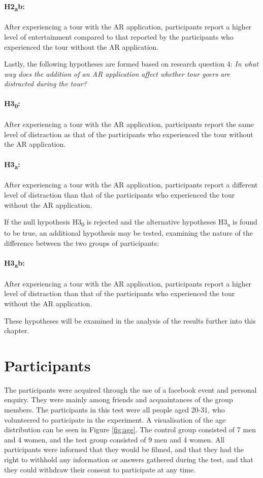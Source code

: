 \paragraph{H2\textsubscript{a}b:} After experiencing a tour with the AR application, participants report a higher level of entertainment compared to that reported by the participants who experienced the tour without the AR application.

Lastly, the following hypotheses are formed based on research question 4: \textit{In what way does the addition of an AR application affect whether tour goers are distracted during the tour?}

\paragraph{H3\textsubscript{0}:} After experiencing a tour with the AR application, participants report the same level of distraction as that of the participants who experienced the tour without the AR application.

\paragraph{H3\textsubscript{a}:}After experiencing a tour with the AR application, participants report a different level of distraction than that of the participants who experienced the tour without the AR application.

If the null hypothesis H3\textsubscript{0} is rejected and the alternative hypotheses H3\textsubscript{a} is found to be true, an additional hypothesis may be tested, examining the nature of the difference between the two groups of participants:

\paragraph{H3\textsubscript{a}b:} After experiencing a tour with the AR application, participants report a higher level of distraction than that of the participants who experienced the tour without the AR application.

These hypotheses will be examined in the analysis of the results further into this chapter.

\section{Participants}
The participants were acquired through the use of a facebook event and personal enquiry. They were mainly among friends and acquaintances of the group members.  
The participants in this test were all people aged 20-31, who volunteered to participate in the experiment. A visualisation of the age distribution can be seen in Figure \ref{fig:age}. The control group consisted of 7 men and 4 women, and the test group consisted of 9 men and 4 women. All participants were informed that they would be filmed, and that they had the right to withhold any information or answers gathered during the test, and that they could withdraw their consent to participate at any time.

